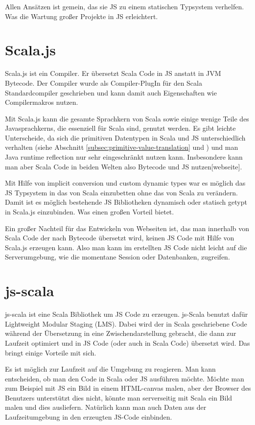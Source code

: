 \documentclass[12pt]{scrreprt}
\begin{document}
Allen Ansätzen ist gemein, das sie JS zu einem statischen Typsystem verhelfen. Was die Wartung großer Projekte in JS erleichtert. 

\section{Scala.js}
\label{sec:scala-js}

Scala.js ist ein Compiler. Er übersetzt Scala Code in JS anstatt in JVM Bytecode\cite{Doeraene2013}. Der Compiler wurde als Compiler-PlugIn für den Scala Standardcompiler geschrieben und kann damit auch Eigenschaften wie Compilermakros nutzen. 

Mit Scala.js kann die gesamte Sprachkern von Scala sowie einige wenige Teile des Javasprachkerns, die essenziell für Scala sind, genutzt werden. Es gibt leichte Unterscheide, da sich die primitiven Datentypen in Scala und JS unterschiedlich verhalten (siehe Abschnitt \ref{subsec:primitive-value-translation} und \cite{Doeraene2014}) und man Java runtime reflection nur sehr eingeschränkt nutzen kann. Insbesondere kann man aber Scala Code in beiden Welten also Bytecode und JS nutzen[webseite].

Mit Hilfe von implicit conversion und custom dynamic types war es möglich das JS Typsystem in das von Scala einzubetten ohne das von Scala zu verändern. Damit ist es möglich bestehende JS Bibliotheken dynamisch oder statisch getypt in Scala.js einzubinden. Was einen großen Vorteil bietet. 

Ein großer Nachteil für das Entwickeln von Webseiten ist, das man innerhalb von Scala Code der nach Bytecode übersetzt wird, keinen JS Code mit Hilfe von Scala.js erzeugen kann. Also man kann im erstellten JS Code nicht leicht auf die Serverumgebung, wie die momentane Session oder Datenbanken, zugreifen.

\section{js-scala}

js-scala ist eine Scala Bibliothek um JS Code zu erzeugen\cite{Kossakowski2012}. js-Scala benutzt dafür Lightweight Modular Staging (LMS)\cite{Rompf2010}. Dabei wird der in Scala geschriebene Code während der Übersetzung in eine Zwischendarstellung gebracht, die dann zur Laufzeit optimiert und in JS Code (oder auch in Scala Code) übersetzt wird. Das bringt einige Vorteile mit sich. 

Es ist möglich zur Laufzeit auf die Umgebung zu reagieren. Man kann entscheiden, ob man den Code in Scala oder JS ausführen möchte. Möchte man zum Beispiel mit JS ein Bild in einem HTML-canvas malen, aber der Browser des Benutzers unterstützt dies nicht, könnte man serverseitig mit Scala ein Bild malen und dies ausliefern. Natürlich kann man auch Daten aus der Laufzeitumgebung in den erzeugten JS-Code einbinden.
\end{document}
